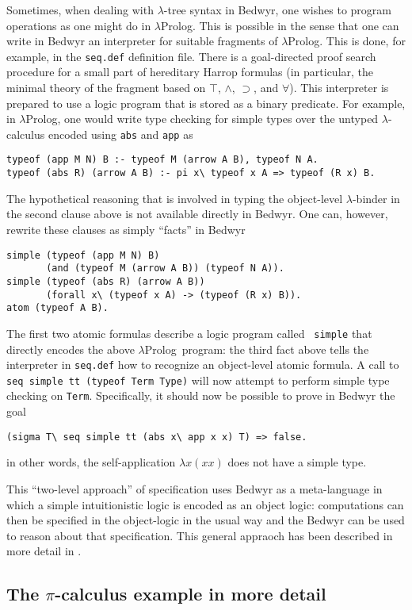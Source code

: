\documentclass{article}
\newcommand{\lp}{$\lambda$Prolog}
\begin{document}
Sometimes, when dealing with $\lambda$-tree syntax in Bedwyr, one
wishes to program operations as one might do in \lp.  This is possible
in the sense that one can write in Bedwyr an interpreter for suitable
fragments of \lp.  This is done, for example, in the {\tt seq.def}
definition file.  There is a goal-directed proof search procedure for a
small part of hereditary Harrop formulas (in particular, the minimal
theory of the fragment based on $\top$, $\wedge$, $\supset$, and
$\forall$).  This interpreter is prepared to use a logic program that
is stored as a binary predicate.  For example, in \lp, one would write
type checking for simple types over the untyped $\lambda$-calculus
encoded using {\tt abs} and {\tt app} as
\begin{verbatim}
typeof (app M N) B :- typeof M (arrow A B), typeof N A.
typeof (abs R) (arrow A B) :- pi x\ typeof x A => typeof (R x) B.
\end{verbatim}
The hypothetical reasoning that is involved in typing the object-level
$\lambda$-binder in the second clause above is not available directly
in Bedwyr.  One can, however, rewrite these clauses as simply
``facts'' in Bedwyr
\begin{verbatim}
simple (typeof (app M N) B)
       (and (typeof M (arrow A B)) (typeof N A)).
simple (typeof (abs R) (arrow A B))
       (forall x\ (typeof x A) -> (typeof (R x) B)).
atom (typeof A B).
\end{verbatim}
The first two atomic formulas describe a logic program called {\tt
simple} that directly encodes the above \lp\ program: the third fact
above tells the interpreter in {\tt seq.def} how to recognize an
object-level atomic formula.  A call to
\verb+seq simple tt (typeof Term Type)+ will now attempt to perform
simple type checking on {\tt Term}.  Specifically, it should now be
possible to prove in Bedwyr the goal
\begin{verbatim}
(sigma T\ seq simple tt (abs x\ app x x) T) => false.
\end{verbatim}
in other words, the self-application $\lambda x(x x)$ does not have a
simple type.

This ``two-level approach'' of specification uses Bedwyr as a
meta-language in which a simple intuitionistic logic is encoded as an
object logic: computations can then be specified in the object-logic
in the usual way and the Bedwyr can be used to reason about that specification.
This general appraoch has been described in more detail in
\cite{miller06ijcar}.

\subsection{The $\pi$-calculus example in more detail}
\label{pi-examples}
\end{document}
